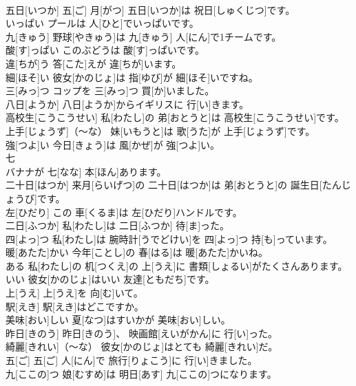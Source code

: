 \documentclass[8pt]{extreport}
\begin{document}
\begin{CJK}{UTF8}{min}
\\	五日[いつか]	五[ご] 月[がつ] 五日[いつか]は 祝日[しゅくじつ]です。		
\\	いっぱい	プールは 人[ひと]でいっぱいです。		
\\	九[きゅう]	野球[やきゅう]は 九[きゅう] 人[にん]で1チームです。		
\\	酸[す]っぱい	このぶどうは 酸[す]っぱいです。		
\\	違[ちが]う	答[こた]えが 違[ちが]います。		
\\	細[ほそ]い	彼女[かのじょ]は 指[ゆび]が 細[ほそ]いですね。		
\\	三[みっ]つ	コップを 三[みっ]つ 買[か]いました。		
\\	八日[ようか]	八日[ようか]からイギリスに 行[い]きます。		
\\	高校生[こうこうせい]	私[わたし]の 弟[おとうと]は 高校生[こうこうせい]です。		
\\	上手[じょうず]（～な）	妹[いもうと]は 歌[うた]が 上手[じょうず]です。		
\\	強[つよ]い	今日[きょう]は 風[かぜ]が 強[つよ]い。		
\\	七
\\	[なな]	バナナが 七[なな] 本[ほん]あります。		
\\	二十日[はつか]	来月[らいげつ]の 二十日[はつか]は 弟[おとうと]の 誕生日[たんじょうび]です。		
\\	左[ひだり]	この 車[くるま]は 左[ひだり]ハンドルです。		
\\	二日[ふつか]	私[わたし]は 二日[ふつか] 待[ま]った。		
\\	四[よっ]つ	私[わたし]は 腕時計[うでどけい]を 四[よっ]つ 持[も]っています。		
\\	暖[あたた]かい	今年[ことし]の 春[はる]は 暖[あたた]かいね。		
\\	ある	私[わたし]の 机[つくえ]の 上[うえ]に 書類[しょるい]がたくさんあります。		
\\	いい	彼女[かのじょ]はいい 友達[ともだち]です。		
\\	上[うえ]	上[うえ]を 向[む]いて。		
\\	駅[えき]	駅[えき]はどこですか。		
\\	美味[おい]しい	夏[なつ]はすいかが 美味[おい]しい。		
\\	昨日[きのう]	昨日[きのう]、 映画館[えいがかん]に 行[い]った。		
\\	綺麗[きれい]（～な）	彼女[かのじょ]はとても 綺麗[きれい]だ。		
\\	五[ご]	五[ご] 人[にん]で 旅行[りょこう]に 行[い]きました。		
\\	九[ここの]つ	娘[むすめ]は 明日[あす] 九[ここの]つになります。		

\end{CJK}
\end{document}
